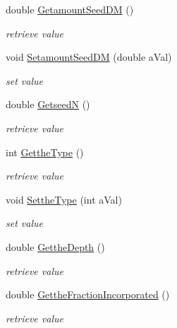\begin{DoxyCompactItemize}
double \hyperlink{classpatch_interface_class_a49a343736a61c4f719aee6285086726c}{GetamountSeedDM} ()
\begin{DoxyCompactList}\small\item\em retrieve value \item\end{DoxyCompactList}\item 
void \hyperlink{classpatch_interface_class_a265236cfd0782d2d4bc3284a6ad95ba9}{SetamountSeedDM} (double aVal)
\begin{DoxyCompactList}\small\item\em set value \item\end{DoxyCompactList}\item 
double \hyperlink{classpatch_interface_class_a94ec9c977c97d369b6538a7f7fd2efa5}{GetseedN} ()
\begin{DoxyCompactList}\small\item\em retrieve value \item\end{DoxyCompactList}\item 
int \hyperlink{classpatch_interface_class_aa464d78a4163d8dde5b7deccd01079df}{GettheType} ()
\begin{DoxyCompactList}\small\item\em retrieve value \item\end{DoxyCompactList}\item 
void \hyperlink{classpatch_interface_class_a2be7164993aef326ceb9678a0363dc4a}{SettheType} (int aVal)
\begin{DoxyCompactList}\small\item\em set value \item\end{DoxyCompactList}\item 
double \hyperlink{classpatch_interface_class_a96efba308b79b05eee8d2545a5e446b4}{GettheDepth} ()
\begin{DoxyCompactList}\small\item\em retrieve value \item\end{DoxyCompactList}\item 
double \hyperlink{classpatch_interface_class_acb566078fd5c753aff6631b9a7dd5b63}{GettheFractionIncorporated} ()
\begin{DoxyCompactList}\small\item\em retrieve value \item\end{DoxyCompactList}\item 

\end{DoxyCompactItemize}
